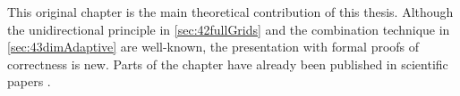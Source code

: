This original chapter is the main theoretical contribution of this thesis.
Although the unidirectional principle in \cref{sec:42fullGrids} and
the combination technique in \cref{sec:43dimAdaptive} are well-known,
the presentation with formal proofs of correctness is new.
Parts of the chapter have already been published in scientific papers
\cite{Valentin18Fundamental}.








\cleardoublepage
